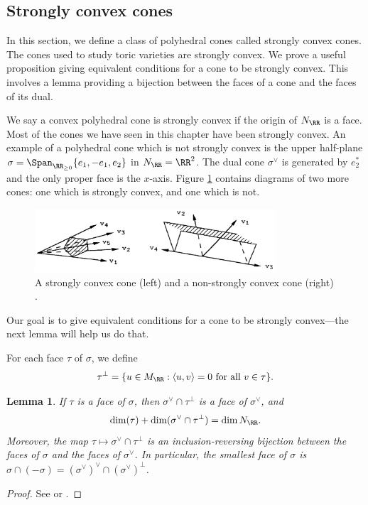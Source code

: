 \documentclass[12pt]{amsart}
\theoremstyle{plain}
\newtheorem{lemma}[theorem]{Lemma}
\theoremstyle{definition}
\begin{document}
\subsection{Strongly convex cones}
In this section, we define a class of polyhedral cones called strongly convex cones.
The cones used to study toric varieties are strongly convex.
We prove a useful proposition giving equivalent conditions for a cone to be strongly convex.
This involves a lemma providing a bijection between the faces of a cone and the faces of its dual.

We say a convex polyhedral cone is strongly convex if the origin of $N_\RR$ is a face.
Most of the cones we have seen in this chapter have been strongly convex.
An example of a polyhedral cone which is not strongly convex is the upper half-plane $\sigma = \Span_{\RR_{\ge 0}}\{e_1, -e_1, e_2\}$ in $N_\RR=\RR^2$.
The dual cone $\sigma^\vee$ is generated by $e_2^*$ and the only proper face is the $x$-axis.
Figure \ref{figure:strongconvexity} contains diagrams of two more cones: one which is strongly convex, and one which is not.

\begin{figure}[h]
\centering
\includegraphics[width=0.8\textwidth]{../images/fultons_cones}
\caption{A strongly convex cone (left) and a non-strongly convex cone (right) \cite{Fulton93}.}
\label{figure:strongconvexity}
\end{figure}

Our goal is to give equivalent conditions for a cone to be strongly convex---the next lemma will help us do that.

For each face $\tau$ of $\sigma$, we define
$$\tau^\perp = \{u \in M_\RR : \langle u, v \rangle = 0 \text{ for all } v \in \tau\}.$$

\begin{lemma}\label{lemma:dualfaces}
If $\tau$ is a face of $\sigma$, then $\sigma^\vee \cap \tau^\perp$ is a face of $\sigma^\vee$, and
$$\dim(\tau) + \dim(\sigma^\vee \cap \tau^\perp) = \dim N_\RR.$$
Moreover, the map $\tau \mapsto \sigma^\vee \cap \tau^\perp$ is an inclusion-reversing bijection between the faces of $\sigma$ and the faces of $\sigma^\vee$.
In particular, the smallest face of $\sigma$ is $\sigma \cap (-\sigma) = (\sigma^\vee)^\vee \cap (\sigma^\vee)^\perp$.
\end{lemma}
\begin{proof}
See \cite[\S 1.2]{Fulton93} or \cite[\S 1]{Zaman13}.
\end{proof}
\end{document}
